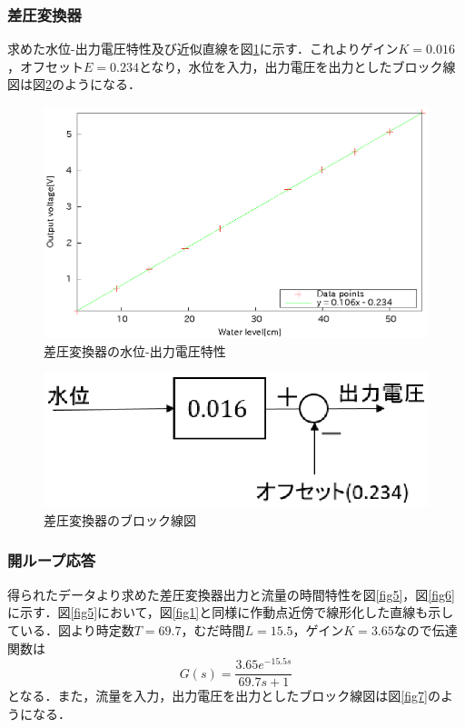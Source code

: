 \documentclass[11pt,a4paper]{jsarticle}
\begin{document}
   \subsubsection{差圧変換器}
   求めた水位-出力電圧特性及び近似直線を図\ref{fig3}に示す．これよりゲイン$K = 0.016$，オフセット$E = 0.234$となり，水位を入力，出力電圧を出力としたブロック線図は図\ref{fig4}のようになる．

   \begin{figure}
    \begin{center}
     \includegraphics[scale=.7] {./picture/exp2.eps}
     \caption{差圧変換器の水位-出力電圧特性}
     \label{fig3}
    \end{center}
   \end{figure}

   \begin{figure}
    \begin{center}
     \includegraphics[scale=.7] {./picture/blocks_exp2.eps}
     \caption{差圧変換器のブロック線図}
     \label{fig4}
    \end{center}
   \end{figure}

   \subsubsection{開ループ応答}
   得られたデータより求めた差圧変換器出力と流量の時間特性を図\ref{fig5}，図\ref{fig6}に示す．図\ref{fig5}において，図\ref{fig1}と同様に作動点近傍で線形化した直線も示している．図より時定数$T = 69.7$，むだ時間$L = 15.5$，ゲイン$K = 3.65$なので伝達関数は
   \begin{equation}
    G(s) = \frac{3.65e^{-15.5s}}{69.7s+1}
   \end{equation}
   となる．また，流量を入力，出力電圧を出力としたブロック線図は図\ref{fig7}のようになる．
\end{document}

